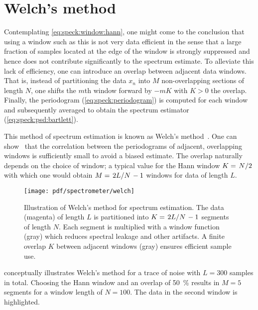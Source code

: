 \section{Welch's method}\label{sec:speck:theory:welch}
Contemplating \cref{eq:speck:window:hann}, one might come to the conclusion that using a window such as this is not very data efficient in the sense that a large fraction of samples located at the edge of the window is strongly suppressed and hence does not contribute significantly to the spectrum estimate.
To alleviate this lack of efficiency, one can introduce an overlap between adjacent data windows.
That is, instead of partitioning the data $x_n$ into $M$ non-overlapping sections of length $N$, one shifts the $m$th window forward by $-mK$ with $K>0$ the overlap.
Finally, the periodogram (\cref{eq:speck:periodogram}) is computed for each window and subsequently averaged to obtain the spectrum estimator (\cref{eq:speck:psd:bartlett}).

This method of spectrum estimation is known as Welch's method~\cite{Welch1967}.
One can show~\cite{Welch1967} that the correlation between the periodograms of adjacent, overlapping windows is sufficiently small to avoid a biased estimate.
The overlap naturally depends on the choice of window; a typical value for the Hann window $K = \flatfrac{N}{2}$ with which one would obtain $M = \flatfrac{2L}{N} - 1$ windows for data of length $L$.
\begin{figure}
    \centering
    \texttt{[image: pdf/spectrometer/welch]}
    \caption{
        Illustration of Welch's method for spectrum estimation.
        The data (magenta) of length $L$ is partitioned into $K = \flatfrac{2L}{N} - 1$ segments of length $N$.
        Each segment is multiplied with a window function (gray) which reduces spectral leakage and other artifacts.
        A finite overlap $K$ between adjacent windows (gray) ensures efficient sample use.
    }
    \label{fig:speck:welch}
\end{figure}

 conceptually illustrates Welch's method for a trace of \oneoverf noise with $L = 300$ samples in total.
Choosing the Hann window and an overlap of \qty{50}{\percent} results in $M=5$ segments for a window length of $N=100$.
The data in the second window is highlighted.

